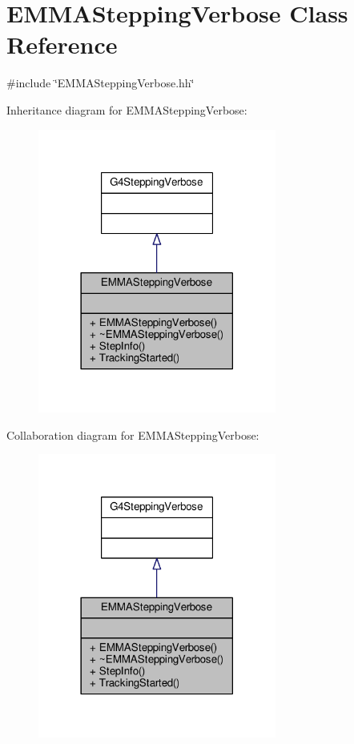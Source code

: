 \hypertarget{classEMMASteppingVerbose}{}\section{E\+M\+M\+A\+Stepping\+Verbose Class Reference}
\label{classEMMASteppingVerbose}


{\ttfamily \#include \char`\"{}E\+M\+M\+A\+Stepping\+Verbose.\+hh\char`\"{}}



Inheritance diagram for E\+M\+M\+A\+Stepping\+Verbose\+:
\nopagebreak
\begin{figure}[H]
\begin{center}
\leavevmode
\includegraphics[width=222pt]{classEMMASteppingVerbose__inherit__graph}
\end{center}
\end{figure}


Collaboration diagram for E\+M\+M\+A\+Stepping\+Verbose\+:
\nopagebreak
\begin{figure}[H]
\begin{center}
\leavevmode
\includegraphics[width=222pt]{classEMMASteppingVerbose__coll__graph}
\end{center}
\end{figure}
